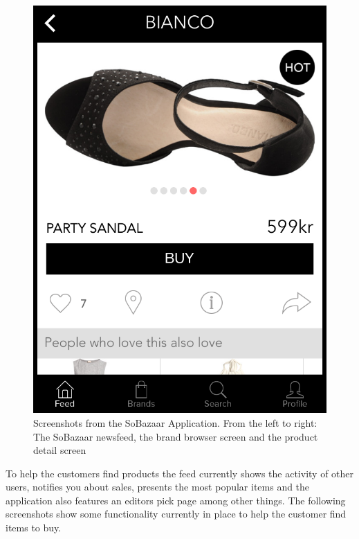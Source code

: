 \begin{figure}[H]
\begin{minipage}{.30\linewidth}
			\includegraphics[height=1.5\linewidth]{image/SoBazaarproduct.png}
		\end{minipage}
		\caption[SoBazaar screenshots - version 0.5.1]{Screenshots from the SoBazaar Application. From the left to right: The SoBazaar newsfeed, the brand browser screen and the product detail screen}
		\label{figure:SoBazaarfeed}
	\end{figure}

	To help the customers find products the feed currently shows the activity of other users, notifies you about sales,
	presents the most popular items and the application also features an editors pick page among other things.
	The following screenshots show some functionality currently in place to help the customer find items to buy.

